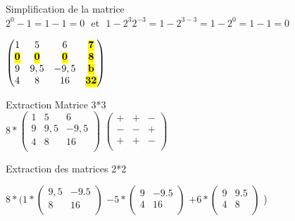 \vspace{5mm} %
Simplification de la matrice \\

\vspace{2mm} %
$2^{0}-1 = 1-1 = 0$ $ $ et  $ $ $1-2^{3} 2^{-3} = 1-2^{3-3} = 1-2^{0} = 1-1 = 0$
\vspace{4mm} %

$
\begin{pmatrix}
  1 & 5 & 6 & \hl{\textbf{7}} \\
  \hl{\textbf{0}} & \hl{\textbf{0}} & \hl{\textbf{0}} & \hl{\textbf{8}} \\
  9 & 9,5 & -9,5 & \hl{\textbf{b}} \\
  4 & 8 & 16 & \hl{\textbf{32}} \\
\end{pmatrix}
$

\vspace{5mm} %
Extraction Matrice 3*3 \\

$
8*
\begin{pmatrix}
  1 & 5 & 6 \\
  9 & 9,5 & {-9,5} \\
  4 & 8 & 16 \\
\end{pmatrix}
$
$
\begin{pmatrix}
  + & + & - \\
  - & - & + \\
  + & + & - \\
\end{pmatrix}
$

\vspace{5mm} %
Extraction des matrices 2*2\\
\vspace{3mm} %

$
8*(
  1*
  \begin{pmatrix}
    9,5 & -9.5 \\
    8 & 16 \\
  \end{pmatrix}
  $
  $
  -5*
  \begin{pmatrix}
    9 & -9.5 \\
    4 & 16 \\
  \end{pmatrix}
  $
  $
  +6*
  \begin{pmatrix}
    9 & 9.5 \\
    4 & 8 \\
  \end{pmatrix}
  $
)

